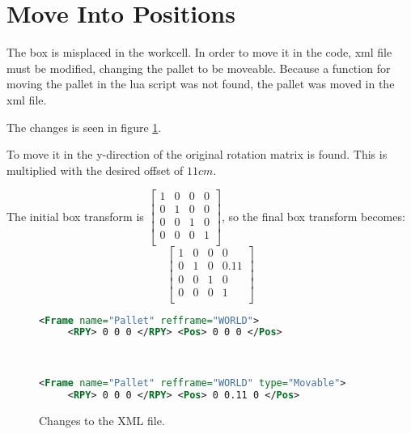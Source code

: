 \section{Move Into Positions}

The box is misplaced in the workcell.
In order to move it in the code, xml file must be modified, changing the pallet to be moveable.
Because a function for moving the pallet in the lua script was not found, the pallet was moved in the xml file.

The changes is seen in figure \ref{fig:commit_xml}.

To move it in the y-direction of the original rotation matrix is found.
This is multiplied with the desired offset of $11 cm$.

The initial box transform is 
\( 
\left[
 \begin{array}{ccc|c}
  1 & 0 & 0 & 0\\
  0 & 1 & 0 & 0\\
  0 & 0 & 1 & 0\\ \hline
  0 & 0 & 0 & 1\\
 \end{array}
\right]
\), so the final box transform becomes: 
\begin{equation}
\left[
 \begin{array}{ccc|c}
  1 & 0 & 0 & 0\\
  0 & 1 & 0 & 0.11\\
  0 & 0 & 1 & 0\\ \hline
  0 & 0 & 0 & 1\\
 \end{array}
\right]
\end{equation}


\begin{figure}[h]
 \centering
\begin{minipage}{0.75\textwidth}
\begin{lstlisting}[backgroundcolor=\color{commit_remove},language=xml]
 <Frame name="Pallet" refframe="WORLD">
     <RPY> 0 0 0 </RPY> <Pos> 0 0 0 </Pos>
\end{lstlisting}
~\\[-1.2cm]
\begin{lstlisting}[backgroundcolor=\color{commit_add},language=xml]
 <Frame name="Pallet" refframe="WORLD" type="Movable"> 
     <RPY> 0 0 0 </RPY> <Pos> 0 0.11 0 </Pos>
\end{lstlisting}
\end{minipage}
\caption{Changes to the XML file. }
\label{fig:commit_xml}
\end{figure}

